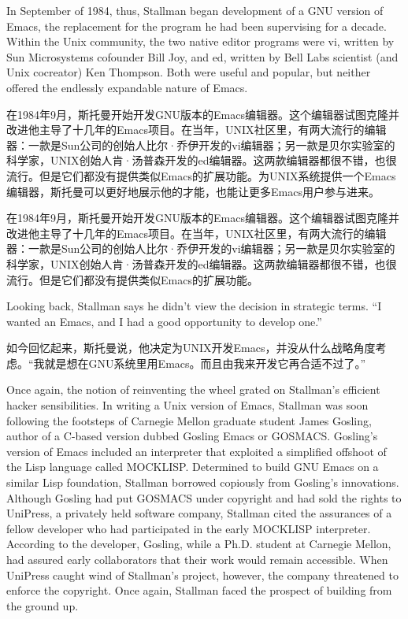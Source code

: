 \ifdefined\vtwo
In September of 1984, thus, Stallman began development of a GNU version of Emacs, the replacement for the program he had been supervising for a decade. Within the Unix community, the two native editor programs were vi, written by Sun Microsystems cofounder Bill Joy, and ed, written by Bell Labs scientist (and Unix cocreator) Ken Thompson. Both were useful and popular, but neither offered the endlessly expandable nature of Emacs.
\fi
\fi

\ifdefined\chs
\ifdefined\vone
在1984年9月，斯托曼开始开发GNU版本的Emacs编辑器。这个编辑器试图克隆并改进他主导了十几年的Emacs项目。在当年，UNIX社区里，有两大流行的编辑器：一款是Sun公司的创始人比尔·乔伊开发的vi编辑器；另一款是贝尔实验室的科学家，UNIX创始人肯·汤普森开发的ed编辑器。这两款编辑器都很不错，也很流行。但是它们都没有提供类似Emacs的扩展功能。为UNIX系统提供一个Emacs编辑器，斯托曼可以更好地展示他的才能，也能让更多Emacs用户参与进来。
\fi

\ifdefined\vtwo
在1984年9月，斯托曼开始开发GNU版本的Emacs编辑器。这个编辑器试图克隆并改进他主导了十几年的Emacs项目。在当年，UNIX社区里，有两大流行的编辑器：一款是Sun公司的创始人比尔·乔伊开发的vi编辑器；另一款是贝尔实验室的科学家，UNIX创始人肯·汤普森开发的ed编辑器。这两款编辑器都很不错，也很流行。但是它们都没有提供类似Emacs的扩展功能。
\fi
\fi

\ifdefined\eng
Looking back, Stallman says he didn't view the decision in strategic terms. ``I wanted an Emacs, and I had a good opportunity to develop one.''
\fi

\ifdefined\chs
如今回忆起来，斯托曼说，他决定为UNIX开发Emacs，并没从什么战略角度考虑。``我就是想在GNU系统里用Emacs。而且由我来开发它再合适不过了。''
\fi

\ifdefined\vone
\ifdefined\eng
Once again, the notion of reinventing the wheel grated on Stallman's efficient hacker sensibilities. In writing a Unix version of Emacs, Stallman was soon following the footsteps of Carnegie Mellon graduate student James Gosling, author of a C-based version dubbed Gosling Emacs or GOSMACS. Gosling's version of Emacs included an interpreter that exploited a simplified offshoot of the Lisp language called MOCKLISP. Determined to build GNU Emacs on a similar Lisp foundation, Stallman borrowed copiously from Gosling's innovations. Although Gosling had put GOSMACS under copyright and had sold the rights to UniPress, a privately held software company, Stallman cited the assurances of a fellow developer who had participated in the early MOCKLISP interpreter. According to the developer, Gosling, while a Ph.D. student at Carnegie Mellon, had assured early collaborators that their work would remain accessible. When UniPress caught wind of Stallman's project, however, the company threatened to enforce the copyright. Once again, Stallman faced the prospect of building from the ground up.
\fi

